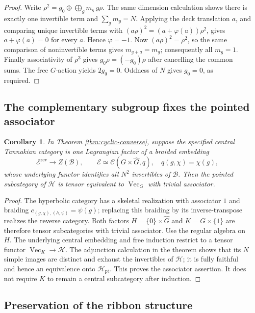 \documentclass[11pt,a4paper]{article}
\numberwithin{equation}{section}
\newtheorem{corollary}[theorem]{Corollary}
\theoremstyle{definition}\newtheorem{definition}[theorem]{Definition}
\theoremstyle{remark}\newtheorem{remark}[theorem]{Remark}
\begin{document}
\begin{proof}
Write
$\rho^2=g_0\oplus\bigoplus_g m_g\,g\rho$.
The same dimension calculation shows there is exactly one
invertible term and $\sum_gm_g=N$.
Applying the deck translation $a$, and comparing unique invertible
terms with
$(a\rho)^2=(a+\varphi(a))\rho^2$, gives
$a+\varphi(a)=0$ for every $a$. Hence $\varphi=-1$.
Now $(a\rho)^2=\rho^2$, so the same comparison of noninvertible
terms gives $m_{g+a}=m_g$; consequently all $m_g=1$.
Finally associativity of $\rho^3$ gives
$g_0\rho=(-g_0)\rho$ after cancelling the common sums.
The free $G$-action yields $2g_0=0$. Oddness of $N$ gives $g_0=0$,
as required.
\end{proof}

\subsection{The complementary subgroup fixes the pointed associator}

\begin{corollary}\label{cor:untwisted}
In Theorem \ref{thm:cyclic-converse}, suppose the specified central
Tannakian category is one Lagrangian factor of a braided embedding
\[
 \mathcal E^{\mathrm{rev}}\longrightarrow Z(\mathcal B),\qquad
 \mathcal E\simeq\mathcal C(G\times\widehat G,q),\quad
 q(g,\chi)=\chi(g),
\]
whose underlying functor identifies all $N^2$ invertibles of
$\mathcal B$. Then the pointed subcategory of $\mathcal H$ is
tensor equivalent to $\operatorname{Vec}_G$ with trivial associator.
\end{corollary}
\begin{proof}
The hyperbolic category has a skeletal realization with associator $1$
and braiding
$c_{(g,\chi),(h,\psi)}=\psi(g)$; replacing this braiding by its
inverse-transpose realizes the reverse category.
Both factors $H=\{0\}\times\widehat G$ and
$K=G\times\{1\}$ are therefore tensor subcategories with trivial
associator. Use the regular algebra on $H$.
The underlying central embedding and free induction restrict to a
tensor functor $\operatorname{Vec}_K\to\mathcal H$.
The adjunction calculation in the theorem shows that its $N$ simple
images are distinct and exhaust the invertibles of $\mathcal H$;
it is fully faithful and hence an equivalence onto
$\mathcal H_{\mathrm{pt}}$. This proves the associator assertion.
It does not require $K$ to remain a central subcategory after induction.
\end{proof}

\subsection{Preservation of the ribbon structure}
\end{document}
